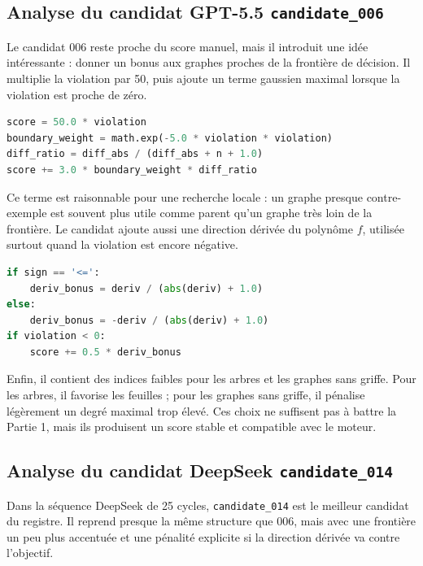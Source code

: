 \documentclass[11pt,a4paper]{article}
\begin{document}
\subsection{Analyse du candidat GPT-5.5 \texttt{candidate\_006}}

Le candidat 006 reste proche du score manuel, mais il introduit une idée intéressante : donner un bonus aux graphes proches de la frontière de décision. Il multiplie la violation par 50, puis ajoute un terme gaussien maximal lorsque la violation est proche de zéro.

\begin{lstlisting}[language=Python,caption={Extrait de \texttt{candidate\_006.py}.}]
score = 50.0 * violation
boundary_weight = math.exp(-5.0 * violation * violation)
diff_ratio = diff_abs / (diff_abs + n + 1.0)
score += 3.0 * boundary_weight * diff_ratio
\end{lstlisting}

Ce terme est raisonnable pour une recherche locale : un graphe presque contre-exemple est souvent plus utile comme parent qu'un graphe très loin de la frontière. Le candidat ajoute aussi une direction dérivée du polynôme \(f\), utilisée surtout quand la violation est encore négative.

\begin{lstlisting}[language=Python,caption={Guidage par dérivée dans \texttt{candidate\_006.py}.}]
if sign == '<=':
    deriv_bonus = deriv / (abs(deriv) + 1.0)
else:
    deriv_bonus = -deriv / (abs(deriv) + 1.0)
if violation < 0:
    score += 0.5 * deriv_bonus
\end{lstlisting}

Enfin, il contient des indices faibles pour les arbres et les graphes sans griffe. Pour les arbres, il favorise les feuilles ; pour les graphes sans griffe, il pénalise légèrement un degré maximal trop élevé. Ces choix ne suffisent pas à battre la Partie 1, mais ils produisent un score stable et compatible avec le moteur.

\subsection{Analyse du candidat DeepSeek \texttt{candidate\_014}}

Dans la séquence DeepSeek de 25 cycles, \texttt{candidate\_014} est le meilleur candidat du registre. Il reprend presque la même structure que 006, mais avec une frontière un peu plus accentuée et une pénalité explicite si la direction dérivée va contre l'objectif.
\end{document}
